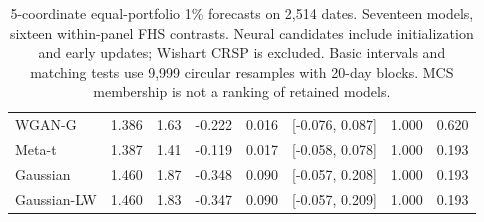 \documentclass[11pt]{article}
\theoremstyle{definition}\newtheorem{definition}[theorem]{Definition}
\theoremstyle{remark}\newtheorem{remark}[theorem]{Remark}
\begin{document}
\begin{table}[htbp]
\begin{tabular}{lrrrrrrr}
WGAN-G & 1.386 & 1.63 & -0.222 & 0.016 & [-0.076, 0.087] & 1.000 & 0.620 \\
Meta-t & 1.387 & 1.41 & -0.119 & 0.017 & [-0.058, 0.078] & 1.000 & 0.193 \\
Gaussian & 1.460 & 1.87 & -0.348 & 0.090 & [-0.057, 0.208] & 1.000 & 0.193 \\
Gaussian-LW & 1.460 & 1.83 & -0.347 & 0.090 & [-0.057, 0.209] & 1.000 & 0.193 \\
\bottomrule
\end{tabular}
\caption{5-coordinate equal-portfolio 1\% forecasts on 2,514 dates. Seventeen models, sixteen within-panel FHS contrasts. Neural candidates include initialization and early updates; Wishart CRSP is excluded. Basic intervals and matching tests use 9,999 circular resamples with 20-day blocks. MCS membership is not a ranking of retained models.}\label{tab:r4-crsp5-primary}
\end{table}
\end{document}
